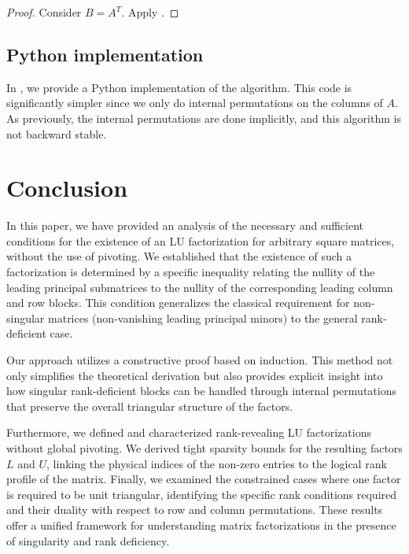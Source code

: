 \documentclass[10pt,twoside]{siamart1116}
\numberwithin{theorem}{section}
\providecommand{\DIFadd}[1]{{\protect\color{blue} \sf #1}} %
\providecommand{\DIFdel}[1]{{\protect\color{red} \scriptsize #1}} %
\providecommand{\DIFaddbegin}{} %
\providecommand{\DIFaddend}{} %
\providecommand{\DIFdelbegin}{} %
\providecommand{\DIFdelend}{} %
\begin{document}
\begin{proof}
  Consider $B = A^T$. Apply .
\end{proof}

\subsection{Python implementation}

In , we provide a Python implementation of the algorithm. This code is significantly simpler since we only do internal permutations on the columns of $A$. As previously, the internal permutations are done implicitly, and this algorithm is not backward stable.

\section{Conclusion}

In this paper, we have provided an analysis of the necessary and sufficient conditions for the existence of an LU factorization for arbitrary square matrices, without the use of pivoting. We established that the existence of such a factorization is determined by a specific inequality relating the nullity of the leading principal submatrices to the nullity of the corresponding leading column and row blocks. This condition generalizes the classical requirement for non-singular matrices (non-vanishing leading principal minors) to the general rank-deficient case.

Our approach utilizes a constructive proof based on induction. This method not only simplifies the theoretical derivation but also provides explicit insight into how \DIFdelbegin \DIFdel{singular }\DIFdelend \DIFaddbegin \DIFadd{rank-deficient }\DIFaddend blocks can be handled through internal permutations that preserve the overall triangular structure of the factors.

Furthermore, we defined and characterized rank-revealing LU factorizations without global pivoting. We derived tight sparsity bounds for the resulting factors $L$ and $U$, linking the physical indices of the non-zero entries to the logical rank profile of the matrix. Finally, we examined the constrained cases where one factor is required to be unit triangular, identifying the specific rank conditions required and their duality with respect to row and column permutations. These results offer a unified framework for understanding matrix factorizations in the presence of \DIFdelbegin \DIFdel{singularity and }\DIFdelend rank deficiency.
\end{document}
